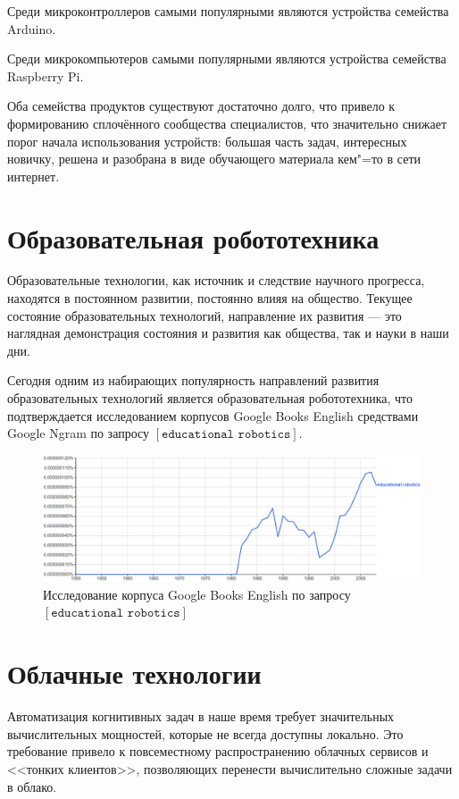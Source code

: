 Среди микроконтроллеров самыми популярными являются устройства семейства Arduino.

Среди микрокомпьютеров самыми популярными являются устройства семейства Raspberry Pi.

Оба семейства продуктов существуют достаточно долго, что привело к формированию сплочённого сообщества специалистов, что значительно снижает порог начала использования устройств: большая часть задач, интересных новичку, решена и разобрана в виде обучающего материала кем"=то в сети интернет.

\section*{Образовательная робототехника}
Образовательные технологии, как источник и следствие научного прогресса, находятся в постоянном развитии, постоянно влияя на общество. Текущее состояние образовательных технологий, направление их развития --- это наглядная демонстрация состояния и развития как общества, так и науки в наши дни.

Сегодня одним из набирающих популярность направлений развития образовательных технологий является образовательная робототехника, что подтверждается исследованием корпусов Google Books English средствами Google Ngram \cite{google-ngram} по запросу $[\texttt{educational\ robotics}]$.


\begin{figure}[H]
\renewcommand\thefigure{0.1} %
    \centering
    \includegraphics[scale=0.3]{images/ngram.png}
    \caption{Исследование корпуса Google Books English по запросу $[\texttt{educational\ robotics}]$}
\end{figure}


\section*{Облачные технологии}
Автоматизация когнитивных задач в наше время требует значительных вычислительных мощностей, которые не всегда доступны локально. Это требование привело к повсеместному распространению облачных сервисов и <<тонких клиентов>>, позволяющих перенести вычислительно сложные задачи в облако.


